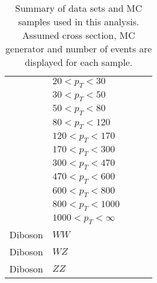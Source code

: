 \begin{landscape}
\begin{table}
\begin{tabular}{l l l r r }
		                    & $20 < p_T < 30$ & & & \\
		                    & $30 < p_T < 50$ & & & \\
		                    & $50 < p_T < 80$ & & & \\
		                    & $80 < p_T < 120$ & & & \\
		                    & $120 < p_T < 170$ & & & \\
		                    & $170 < p_T < 300$ & & & \\
		                    & $300 < p_T < 470$ & & & \\
		                    & $470 < p_T < 600$ & & & \\
		                    & $600 < p_T < 800$ & & & \\
		                    & $800 < p_T < 1000$ & & & \\
		                    & $1000 < p_T < \infty$ & & & \\
		\hline
	 	Diboson & $WW$ & & & \\
	 	Diboson & $WZ$ & & & \\
	 	Diboson & $ZZ$ & & & \\
	 	 \hline
	 \end{tabular}
	\caption{Summary of data sets and MC samples used in this analysis. Assumed cross section, MC generator and number of events are displayed for each sample.}
	\label{MC_Tab}	
	\end{table}
	\end{landscape}